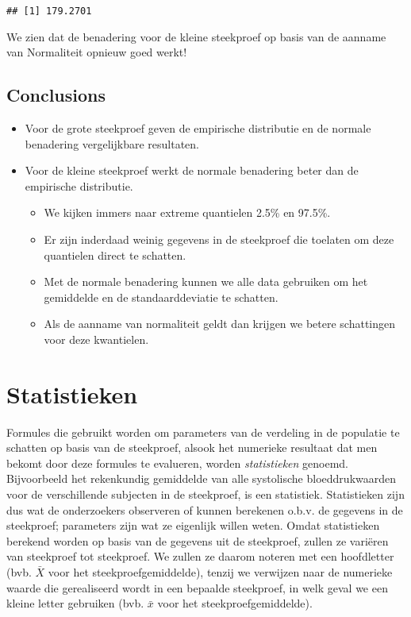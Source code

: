 \documentclass[
  12pt,dutch,coursenotes]{book}
\providecommand{\tightlist}{%
  \setlength{\itemsep}{0pt}\setlength{\parskip}{0pt}}
\theoremstyle{definition}
\theoremstyle{definition}
\theoremstyle{definition}
\theoremstyle{remark}
\begin{document}
\begin{verbatim}
## [1] 179.2701
\end{verbatim}

We zien dat de benadering voor de kleine steekproef op basis van de aanname van Normaliteit opnieuw goed werkt!

\hypertarget{conclusions}{%
\subsection{Conclusions}\label{conclusions}}

\begin{itemize}
\item
  Voor de grote steekproef geven de empirische distributie en de normale benadering vergelijkbare resultaten.
\item
  Voor de kleine steekproef werkt de normale benadering beter dan de empirische distributie.

  \begin{itemize}
  \tightlist
  \item
    We kijken immers naar extreme quantielen 2.5\% en 97.5\%.
  \item
    Er zijn inderdaad weinig gegevens in de steekproef die toelaten om deze quantielen direct te schatten.
  \item
    Met de normale benadering kunnen we alle data gebruiken om het gemiddelde en de standaarddeviatie te schatten.
  \item
    Als de aanname van normaliteit geldt dan krijgen we betere schattingen voor deze kwantielen.
  \end{itemize}
\end{itemize}

\hypertarget{statistieken}{%
\section{Statistieken}\label{statistieken}}

Formules die gebruikt worden om parameters van de verdeling in de populatie te schatten op basis van de
steekproef, alsook het numerieke resultaat dat men bekomt door deze formules
te evalueren, worden \emph{statistieken} genoemd.
Bijvoorbeeld het
rekenkundig gemiddelde van alle systolische bloeddrukwaarden voor de verschillende subjecten
in de steekproef, is een statistiek. Statistieken zijn dus wat
de onderzoekers observeren of kunnen berekenen o.b.v. de gegevens in de
steekproef; parameters zijn wat ze eigenlijk willen weten.
Omdat statistieken berekend worden op basis van de gegevens uit de steekproef, zullen ze variëren van steekproef tot steekproef.
We zullen ze daarom noteren met een hoofdletter (bvb. \(\bar X\) voor het steekproefgemiddelde), tenzij we verwijzen naar de numerieke waarde die gerealiseerd wordt in een bepaalde steekproef, in welk geval we een kleine letter gebruiken (bvb. \(\bar x\) voor het steekproefgemiddelde).
\end{document}
